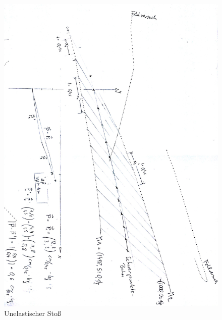 \documentclass[12pt,a4paper]{article}
\begin{document}
\begin{figure}[H]
	\centering
	\includegraphics[scale=0.8]{./figure/inelastischer_stoss.png}
	\caption{Unelastischer Stoß}
	\label{fig:inelastisch_stoss}
\end{figure}
\end{document}
